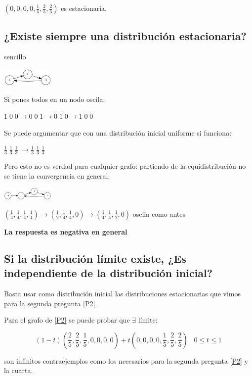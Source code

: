 $(0, 0, 0, 0, \frac{1}{5}, \frac{2}{5}, \frac{2}{5})$ es estacionaria.


\subsection{¿Existe siempre una distribución estacionaria?}

\begin{example}{sencillo}

	\includegraphics{tex/grafo3nodossimple.png}

	Si pones todos en un nodo oscila:

	$1\; 0\; 0 \rightarrow 0\; 0\; 1 \rightarrow 0\; 1\; 0 \rightarrow 1\; 0\; 0$

	Se puede argumentar que con una distribución inicial uniforme si funciona:

	$\frac{1}{3} \; \frac{1}{3} \; \frac{1}{3} \; \rightarrow \frac{1}{3} \; \frac{1}{3} \; \frac{1}{3} \; $

	Pero esto no es verdad para cualquier grafo: partiendo de la equidistribución no se tiene la convergencia en general.

	\includegraphics{tex/grafo4nodos.png}

	$(\frac{1}{4},\frac{1}{4},\frac{1}{4},\frac{1}{4}) \rightarrow (\frac{1}{2},\frac{1}{4},\frac{1}{4}, 0) \rightarrow (\frac{1}{4},\frac{1}{4},\frac{1}{2},0)$ oscila como antes

	\textbf{La respuesta es negativa en general}

\end{example}


\subsection {Si la distribución límite existe, ¿Es independiente de la distribución inicial?}


Basta usar como distribución inicial las distribuciones estacionarias que vimos para la segunda pregunta \ref{P2}.

\begin{obs}

Para el grafo de \ref{P2} se puede probar que $\exists$ límite:

$$(1-t)(\frac{2}{5},\frac{2}{5},\frac{1}{5},0,0,0,0) + t (0,0,0,0,\frac{1}{5},\frac{2}{5},\frac{2}{5}) \;\;\; 0 \leq t \leq 1 $$

son infinitos contraejemplos como los necesarios para la segunda pregunta \ref{P2} y la cuarta.

\end{obs}


